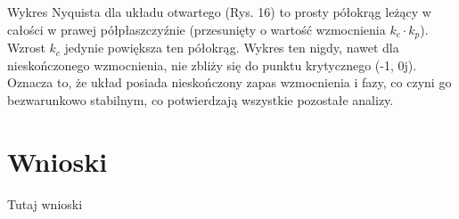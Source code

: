 \documentclass[12pt,a4paper]{article}
\begin{document}
	Wykres Nyquista dla układu otwartego (Rys. 16) to prosty półokrąg leżący w całości w prawej półpłaszczyźnie (przesunięty o wartość wzmocnienia $k_c \cdot k_p$). Wzrost $k_c$ jedynie powiększa ten półokrąg. Wykres ten nigdy, nawet dla nieskończonego wzmocnienia, nie zbliży się do punktu krytycznego (-1, 0j). Oznacza to, że układ posiada nieskończony zapas wzmocnienia i fazy, co czyni go bezwarunkowo stabilnym, co potwierdzają wszystkie pozostałe analizy.
	
	\section{Wnioski}
	Tutaj wnioski
	
\end{document}
